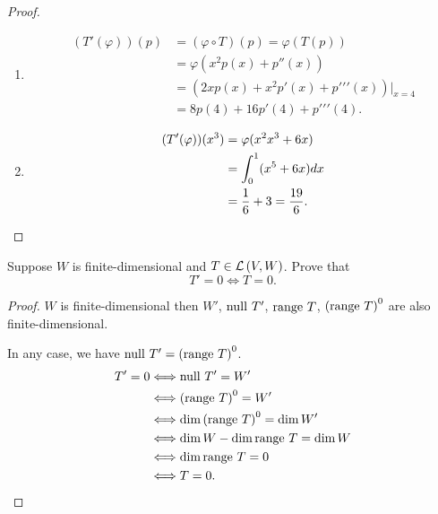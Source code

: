 \begin{proof}
    \begin{enumerate}[label={(\alph*)}]
        \item
              \begin{align*}
                  (T'(\varphi))(p) & = (\varphi\circ T)(p) = \varphi(T(p))                 \\
                                   & = \varphi(x^{2}p(x) + p''(x))                         \\
                                   & = (2x p(x) + x^{2}p'(x) + p{'}{'}{'}(x))\vert_{x = 4} \\
                                   & = 8p(4) + 16p'(4) + p{'}{'}{'}(4).
              \end{align*}
        \item
              \begin{align*}
                  (T'(\varphi))(x^{3}) & = \varphi(x^{2}x^{3} + 6x)                \\
                                       & = \int^{1}_{0}(x^{5} + 6x)dx              \\
                                       & = \frac{1}{6} + 3 = \frac{19}{6}.\qedhere
              \end{align*}
    \end{enumerate}
\end{proof}
\newpage

\begin{exercise}\label{chapter3:sectionF:exercise16}
    Suppose $W$ is finite-dimensional and $T\in\mathcal{L}\left({V, W}\right)$. Prove that
    \[
        T' = 0 \Longleftrightarrow T = 0.
    \]
\end{exercise}

\begin{proof}
    $W$ is finite-dimensional then $W'$, $\operatorname{null}\,{T'}$, $\operatorname{range}\,{T}$, ${(\operatorname{range}\,{T})}^{0}$ are also finite-dimensional.

    In any case, we have $\operatorname{null}\,{T'} = {(\operatorname{range}\,{T})}^{0}$.
    \begin{align*}
        T' = 0 & \Longleftrightarrow \operatorname{null}\,{T'} = W'                 \\
               & \Longleftrightarrow {(\operatorname{range}\,{T})}^{0} = W'           \\
               & \Longleftrightarrow \dim{(\operatorname{range}\,{T})}^{0} = \dim W'  \\
               & \Longleftrightarrow \dim W - \dim \operatorname{range}\,{T} = \dim W \\
               & \Longleftrightarrow \dim\operatorname{range}\,{T} = 0                \\
               & \Longleftrightarrow T = 0.\qedhere
    \end{align*}
\end{proof}
\newpage

